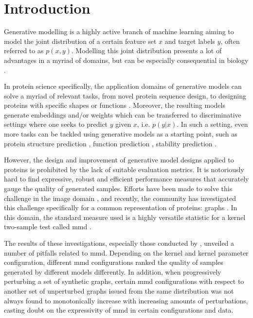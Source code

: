 \chapter{Introduction}


Generative modelling is a highly active branch of machine learning aiming to
model the joint distribution of a certain feature set $x$ and target labels $y$,
often referred to as $p(x,y)$. Modelling this joint distribution presents a lot
of advantages in a myriad of domains, but can be especially
consequential in biology \citep{lopez2020enhancing,strokach2022deep}.

In protein science specifically, the application domains of generative models
can solve a myriad of relevant tasks, from novel protein sequence design, to
designing proteins with specific shapes or functions
\citep{jendrusch2021alphadesign,madani2021deep}. Moreover, the resulting models generate
embeddings and/or weights which can be transferred to discriminative settings
where one seeks to predict $y$ given $x$, i.e. $p(y|x)$. In such a setting, even
more tasks can be tackled using generative models as a starting point, such as protein
structure prediction \citep{jumper2021highly}, function prediction
\citep{meier2021language}, stability prediction \citep{strokach2020fast}.

However, the design and improvement of generative model designs applied to
proteins is prohibited by the lack of suitable evaluation metrics. It is
notoriously hard to find expressive, robust and efficient performance measures
that accurately gauge the quality of generated samples. Efforts have been
made to solve this challenge in the image domain \citep{heusel2017gans}, and
recently, the community has investigated this challenge specifically for a
common representation of proteins: graphs \citep{thompson2022evaluation,
 obray2022evaluation}. In this domain, the standard measure used is a highly
versatile statistic for a kernel two-sample test called \acrfull{mmd}
\citep{gretton2012kernel}.

The results of these investigations, especially those conducted by
\cite{obray2022evaluation}, unveiled a number of pitfalls related to \acrshort{mmd}. Depending
on the kernel and kernel parameter configuration, different \acrshort{mmd} configurations
ranked the quality of samples generated by different models differently. In
addition, when progressively perturbing a set of synthetic graphs, certain \acrshort{mmd}
configurations with respect to another set of unperturbed graphs issued from the
same distribution was not always found to monotonically increase with increasing
amounts of perturbations, casting doubt on the expressivity of \acrshort{mmd} in certain
configurations and data.

